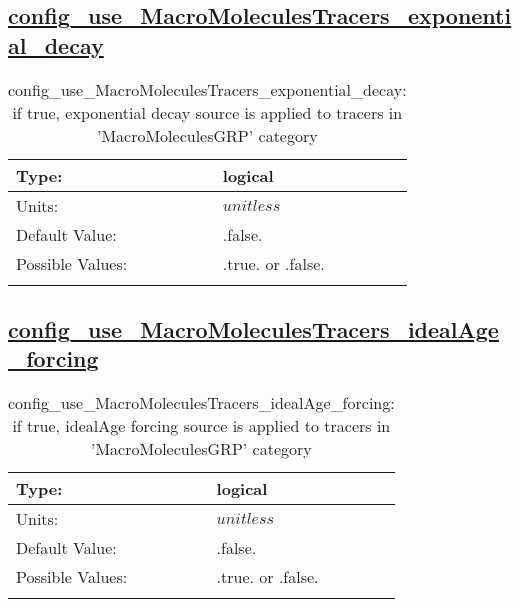 \subsection[config\_use\_MacroMoleculesTracers\_exponential\_decay]{\hyperref[sec:nm_tab_tracer_forcing_MacroMoleculesTracers]{config\_use\_MacroMoleculesTracers\_exponential\_decay}}
\label{subsec:nm_sec_config_use_MacroMoleculesTracers_exponential_decay}
\begin{center}
\begin{longtable}{| p{2.0in} || p{4.0in} |}
    \hline
    Type: & logical \\
    \hline
    Units: & $unitless$ \\
    \hline
    Default Value: & .false. \\
    \hline
    Possible Values: & .true. or .false. \\
    \hline
    \caption{config\_use\_MacroMoleculesTracers\_exponential\_decay: if true, exponential decay source is applied to tracers in 'MacroMoleculesGRP' category}
\end{longtable}
\end{center}
\subsection[config\_use\_MacroMoleculesTracers\_idealAge\_forcing]{\hyperref[sec:nm_tab_tracer_forcing_MacroMoleculesTracers]{config\_use\_MacroMoleculesTracers\_idealAge\_forcing}}
\label{subsec:nm_sec_config_use_MacroMoleculesTracers_idealAge_forcing}
\begin{center}
\begin{longtable}{| p{2.0in} || p{4.0in} |}
    \hline
    Type: & logical \\
    \hline
    Units: & $unitless$ \\
    \hline
    Default Value: & .false. \\
    \hline
    Possible Values: & .true. or .false. \\
    \hline
    \caption{config\_use\_MacroMoleculesTracers\_idealAge\_forcing: if true, idealAge forcing source is applied to tracers in 'MacroMoleculesGRP' category}
\end{longtable}
\end{center}
